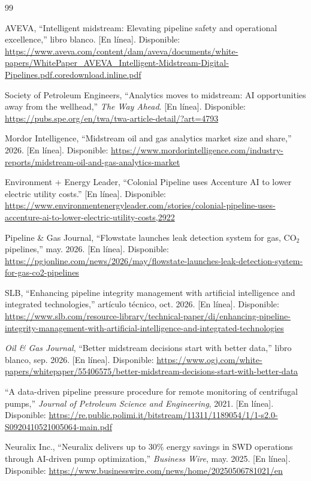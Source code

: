 \documentclass[conference]{IEEEtran}
\begin{document}
\begin{thebibliography}{99}

AVEVA, ``Intelligent midstream: Elevating pipeline safety and operational excellence,'' libro blanco. [En línea]. Disponible: \url{https://www.aveva.com/content/dam/aveva/documents/white-papers/WhitePaper_AVEVA_Intelligent-Midstream-Digital-Pipelines.pdf.coredownload.inline.pdf}

Society of Petroleum Engineers, ``Analytics moves to midstream: AI opportunities away from the wellhead,'' \textit{The Way Ahead}. [En línea]. Disponible: \url{https://pubs.spe.org/en/twa/twa-article-detail/?art=4793}

Mordor Intelligence, ``Midstream oil and gas analytics market size and share,'' 2026. [En línea]. Disponible: \url{https://www.mordorintelligence.com/industry-reports/midstream-oil-and-gas-analytics-market}

Environment + Energy Leader, ``Colonial Pipeline uses Accenture AI to lower electric utility costs.'' [En línea]. Disponible: \url{https://www.environmentenergyleader.com/stories/colonial-pipeline-uses-accenture-ai-to-lower-electric-utility-costs,2922}

Pipeline \& Gas Journal, ``Flowstate launches leak detection system for gas, CO$_2$ pipelines,'' may. 2026. [En línea]. Disponible: \url{https://pgjonline.com/news/2026/may/flowstate-launches-leak-detection-system-for-gas-co2-pipelines}

SLB, ``Enhancing pipeline integrity management with artificial intelligence and integrated technologies,'' artículo técnico, oct. 2026. [En línea]. Disponible: \url{https://www.slb.com/resource-library/technical-paper/di/enhancing-pipeline-integrity-management-with-artificial-intelligence-and-integrated-technologies}

\textit{Oil \& Gas Journal}, ``Better midstream decisions start with better data,'' libro blanco, sep. 2026. [En línea]. Disponible: \url{https://www.ogj.com/white-papers/whitepaper/55406575/better-midstream-decisions-start-with-better-data}

``A data-driven pipeline pressure procedure for remote monitoring of centrifugal pumps,'' \textit{Journal of Petroleum Science and Engineering}, 2021. [En línea]. Disponible: \url{https://re.public.polimi.it/bitstream/11311/1189054/1/1-s2.0-S0920410521005064-main.pdf}

Neuralix Inc., ``Neuralix delivers up to 30\% energy savings in SWD operations through AI-driven pump optimization,'' \textit{Business Wire}, may. 2025. [En línea]. Disponible: \url{https://www.businesswire.com/news/home/20250506781021/en}


\end{thebibliography}
\end{document}

